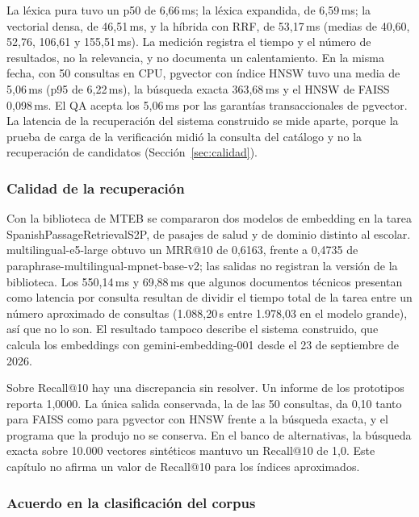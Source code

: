 La léxica pura tuvo un p50 de 6,66\,ms; la léxica expandida, de 6,59\,ms; la vectorial densa, de
46,51\,ms, y la híbrida con RRF, de 53,17\,ms (medias de 40,60, 52,76, 106,61 y 155,51\,ms). La
medición registra el tiempo y el número de resultados, no la relevancia, y no documenta un
calentamiento. En la misma fecha, con 50 consultas en CPU, pgvector con índice HNSW tuvo una media
de 5,06\,ms (p95 de 6,22\,ms), la búsqueda exacta 363,68\,ms y el HNSW de FAISS 0,098\,ms. El QA
acepta los 5,06\,ms por las garantías transaccionales de pgvector. La latencia de la recuperación
del sistema construido se mide aparte, porque la prueba de carga de la verificación midió la consulta
del catálogo y no la recuperación de candidatos
(Sección~\ref{sec:calidad}).

\subsubsection{Calidad de la recuperación}

Con la biblioteca de MTEB \citep{muennighoff_mteb_2023} se compararon dos modelos de embedding en
la tarea SpanishPassageRetrievalS2P, de pasajes de salud y de dominio distinto al escolar.
multilingual-e5-large obtuvo un MRR@10 de 0,6163, frente a 0,4735 de
paraphrase-multilingual-mpnet-base-v2; las salidas no registran la versión de la biblioteca. Los
550,14\,ms y 69,88\,ms que algunos documentos técnicos presentan como latencia por consulta resultan
de dividir el tiempo total de la tarea entre un número aproximado de consultas (1.088,20\,s entre
1.978,03 en el modelo grande), así que no lo son. El resultado tampoco describe el sistema
construido, que calcula los embeddings con gemini-embedding-001 desde el 23 de septiembre de 2026.

Sobre Recall@10 hay una discrepancia sin resolver. Un informe de los prototipos reporta 1,0000. La
única salida conservada, la de las 50 consultas, da 0,10 tanto para FAISS como para pgvector con
HNSW frente a la búsqueda exacta, y el programa que la produjo no se conserva. En el banco de
alternativas, la búsqueda exacta sobre 10.000 vectores sintéticos mantuvo un Recall@10 de 1,0. Este
capítulo no afirma un valor de Recall@10 para los índices aproximados.



\subsubsection{Acuerdo en la clasificación del corpus}

